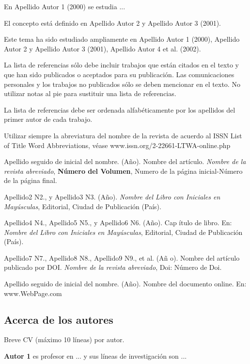 \documentclass[10pt,twoside,spanish]{article}
\numberwithin{equation}{section}
\begin{document}
En Apellido Autor 1 (2000) se estudia ...

El concepto está definido en Apellido Autor 2 y Apellido Autor 3 (2001).

Este tema ha sido estudiado ampliamente en Apellido Autor 1 (2000), Apellido
Autor 2 y Apellido Autor 3 (2001), Apellido Autor 4 et al. (2002).

La lista de referencias sólo debe incluir trabajos que están citados en el
texto y que han sido publicados o aceptados para su publicación. Las
comunicaciones personales y los trabajos no publicados sólo se deben
mencionar en el texto. No utilizar notas al pie para sustituir una lista de
referencias.

La lista de referencias debe ser ordenada alfabéticamente por los apellidos
del primer autor de cada trabajo.

Utilizar siempre la abreviatura del nombre de la revista de acuerdo al ISSN
List of Title Word Abbreviations, véase www.issn.org/2-22661-LTWA-online.php

\begin{thebibliography}{9}
 Apellido seguido de inicial del nombre. (Año). Nombre
del artículo. \emph{Nombre de la revista abreviado}, \textbf{Número del
Volumen}, Numero de la página inicial-Número de la página final.

 Apellido2 N2., y Apellido3 N3. (Año). \emph{Nombre del
Libro con Iniciales en Mayúsculas}, Editorial, Ciudad de Publicación (País).

 Apellido4 N4., Apellido5 N5., y Apellido6 N6. (Año). Cap%
ítulo de libro. En: \emph{Nombre del Libro con Iniciales en Mayúsculas},
Editorial, Ciudad de Publicación (País).

 Apellido7 N7., Apellido8 N8., Apellido9 N9., et al. (Añ%
o). Nombre del artículo publicado por DOI. \emph{Nombre de la revista
abreviado}, Doi: Número de Doi.

 Apellido seguido de inicial del nombre. (Año). Nombre
del documento online. En: www.WebPage.com
\end{thebibliography}

\subsection*{Acerca de los autores}%

Breve CV (máximo 10 líneas) por autor.

\textbf{Autor 1} es profesor en ... y sus líneas de investigación son ...
\end{document}

